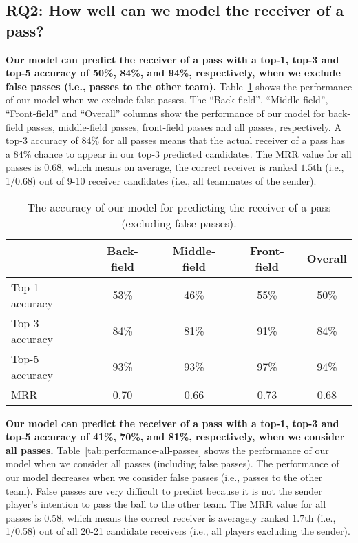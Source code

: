 \subsection{RQ2: How well can we model the receiver of a pass?}\label{RQ2-results}

\textbf{Our model can predict the receiver of a pass with a top-1, top-3 and top-5 accuracy of 50\%, 84\%, and 94\%, respectively, when we exclude false passes (i.e., passes to the other team).}
Table~\ref{tab:performance-accurate-passes} shows the performance of our model when we exclude false passes. 
The ``Back-field'', ``Middle-field'', ``Front-field'' and ``Overall'' columns show the performance of our model for back-field passes, middle-field passes, front-field passes and all passes, respectively. 
A top-3 accuracy of 84\% for all passes means that the actual receiver of a pass has a 84\% chance to appear in our top-3 predicted candidates.
The MRR value for all passes is 0.68, which means on average, the correct receiver is ranked $1.5$th (i.e., 1/0.68) out of 9-10 receiver candidates (i.e., all teammates of the sender).


\begin{table}[!t]
\caption{The accuracy of our model for predicting the receiver of a pass (excluding false passes).}
\centering
\begin{tabular}{lcccc}
  \hline
  & Back-field & Middle-field & Front-field & Overall \\
  \hline
  Top-1 accuracy & 53\% & 46\% & 55\% & 50\% \\
  Top-3 accuracy & 84\% & 81\% & 91\% & 84\% \\
  Top-5 accuracy & 93\% & 93\% & 97\% & 94\% \\
  MRR & 0.70 & 0.66 & 0.73 & 0.68 \\
  \hline
\end{tabular}
\label{tab:performance-accurate-passes}
\vspace{-0.3cm}
\end{table}

\textbf{Our model can predict the receiver of a pass with a top-1, top-3 and top-5 accuracy of 41\%, 70\%, and 81\%, respectively, when we consider all passes.}
Table~\ref{tab:performance-all-passes} shows the performance of our model when we consider all passes (including false passes). 
The performance of our model decreases when we consider false passes (i.e., passes to the other team). 
False passes are very difficult to predict because it is not the sender player's intention to pass the ball to the other team. 
The MRR value for all passes is 0.58, which means the correct receiver is averagely ranked $1.7$th (i.e., 1/0.58) out of all 20-21 candidate receivers (i.e., all players excluding the sender).

